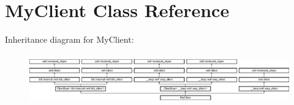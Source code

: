 \hypertarget{classMyClient}{}\section{My\+Client Class Reference}
\label{classMyClient}
Inheritance diagram for My\+Client\+:\begin{figure}[H]
\begin{center}
\leavevmode
\includegraphics[height=2.222222cm]{classMyClient}
\end{center}
\end{figure}
